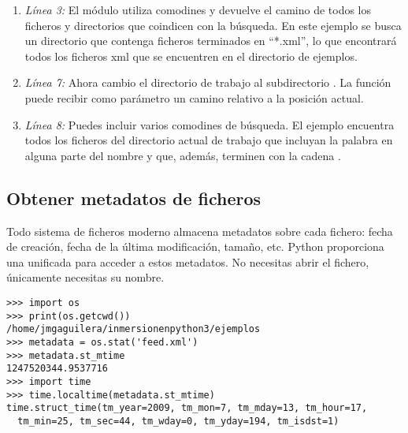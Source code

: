 \begin{enumerate}

\item \emph{Línea 3:} El módulo  utiliza comodines y devuelve el camino de todos los ficheros y directorios que coindicen con la búsqueda. En este ejemplo se busca un directorio que contenga ficheros terminados en ``*.xml'', lo que encontrará todos los ficheros xml que se encuentren en el directorio de ejemplos.

\item \emph{Línea 7:} Ahora cambio el directorio de trabajo al subdirectorio . La función  puede recibir como parámetro un camino relativo a la posición actual.

\item \emph{Línea 8:} Puedes incluir varios comodines de búsqueda. El ejemplo encuentra todos los ficheros del directorio actual de trabajo que incluyan la palabra  en alguna parte del nombre y que, además, terminen con la cadena .

\end{enumerate}

\subsection{Obtener metadatos de ficheros}

Todo sistema de ficheros moderno almacena metadatos sobre cada fichero: fecha de creación, fecha de la última modificación, tamaño, etc. Python proporciona una  unificada para acceder a estos metadatos. No necesitas abrir el fichero, únicamente necesitas su nombre.

\noindent\begin{minipage}{\textwidth}
\begin{lstlisting}[mathescape=True]
>>> import os
>>> print(os.getcwd())
/home/jmgaguilera/inmersionenpython3/ejemplos
>>> metadata = os.stat('feed.xml')
>>> metadata.st_mtime
1247520344.9537716
>>> import time
>>> time.localtime(metadata.st_mtime)
time.struct_time(tm_year=2009, tm_mon=7, tm_mday=13, tm_hour=17,
  tm_min=25, tm_sec=44, tm_wday=0, tm_yday=194, tm_isdst=1)
\end{lstlisting}
\end{minipage}

